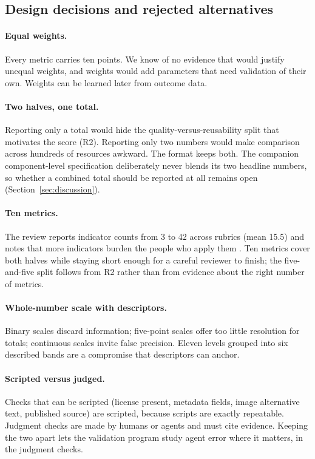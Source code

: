 \subsection{Design decisions and rejected alternatives}
\paragraph{Equal weights.} Every metric carries ten points. We know of no evidence that would justify unequal weights, and weights would add parameters that need validation of their own. Weights can be learned later from outcome data.

\paragraph{Two halves, one total.} Reporting only a total would hide the quality-versus-reusability split that motivates the score (R2). Reporting only two numbers would make comparison across hundreds of resources awkward. The format keeps both. The companion component-level specification \cite{oerevaluator} deliberately never blends its two headline numbers, so whether a combined total should be reported at all remains open (Section~\ref{sec:discussion}).

\paragraph{Ten metrics.} The review reports indicator counts from 3 to 42 across rubrics (mean 15.5) and notes that more indicators burden the people who apply them \cite{yuan2015}. Ten metrics cover both halves while staying short enough for a careful reviewer to finish; the five-and-five split follows from R2 rather than from evidence about the right number of metrics.

\paragraph{Whole-number scale with descriptors.} Binary scales discard information; five-point scales offer too little resolution for totals; continuous scales invite false precision. Eleven levels grouped into six described bands are a compromise that descriptors can anchor.

\paragraph{Scripted versus judged.} Checks that can be scripted (license present, metadata fields, image alternative text, published source) are scripted, because scripts are exactly repeatable. Judgment checks are made by humans or agents and must cite evidence. Keeping the two apart lets the validation program study agent error where it matters, in the judgment checks.
